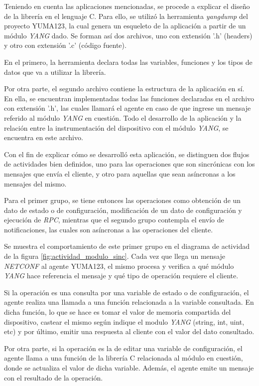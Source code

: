   Teniendo en cuenta las aplicaciones mencionadas, se procede a explicar el diseño de la librería en el lenguaje C. Para ello, se utilizó la herramienta \textit{yangdump} del proyecto YUMA123, la cual genera un esqueleto de la aplicación a partir de un módulo \textit{YANG} dado. Se forman así dos archivos, uno con extensión '.h' (headers) y otro con extensión '.c' (código fuente). 
  

  En el primero, la herramienta declara todas las variables, funciones y los tipos de datos que va a utilizar la librería. 

  Por otra parte, el segundo archivo contiene la estructura de la aplicación en sí. En ella, se encuentran implementadas todas las funciones declaradas en el archivo con extensión '.h', las cuales llamará el agente en caso de que ingrese un mensaje referido al módulo \textit{YANG} en cuestión. Todo el desarrollo de la aplicación y la relación entre la instrumentación del dispositivo con el módulo \textit{YANG}, se encuentra en este archivo. 


  Con el fin de explicar cómo se desarrolló esta aplicación, se distinguen dos flujos de actividades bien definidos, uno para las operaciones que son sincrónicas con los mensajes que envía el cliente, y otro para aquellas que sean asíncronas a los mensajes del mismo. 

  Para el primer grupo, se tiene entonces las operaciones como obtención de un dato de estado o de configuración, modificación de un dato de configuración y ejecución de \textit{RPC}, mientras que el segundo grupo contempla el envío de notificaciones, las cuales son asíncronas a las operaciones del cliente.
  

  Se muestra el comportamiento de este primer grupo en el diagrama de actividad de la figura \ref{fig:actividad_modulo_sinc}. Cada vez que llega un mensaje \textit{NETCONF} al agente YUMA123, el mismo procesa y verifica a qué módulo \textit{YANG} hace referencia el mensaje y qué tipo de operación requiere el cliente. 

  Si la operación es una consulta por una variable de estado o de configuración, el agente realiza una llamada a una función relacionada a la variable consultada. En dicha función, lo que se hace es tomar el valor de memoria compartida del dispositivo, castear el mismo según indique el modulo \textit{YANG} (string, int, uint, etc) y por último, emitir una respuesta al cliente con el valor del dato consultado.

  Por otra parte, si la operación es la de editar una variable de configuración, el agente llama a una función de la librería C relacionada al módulo en cuestión, donde se actualiza el valor de dicha variable. Además, el agente emite un mensaje con el resultado de la operación. 


